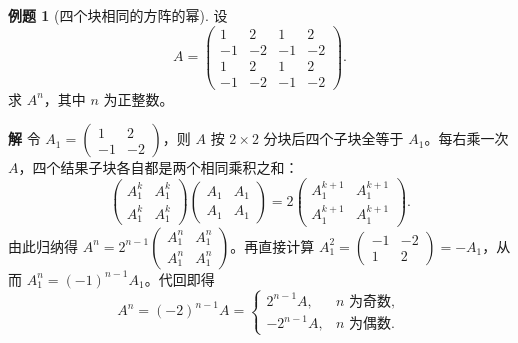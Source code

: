 \documentclass[UTF8, fontset=fandol, a4paper, 12pt]{ctexart}
\theoremstyle{definition}
\newtheorem{example}[definition]{例题}
\begin{document}
\begin{example}[四个块相同的方阵的幂]
设
\[
 A=\begin{pmatrix}
  1&2&1&2\\
  -1&-2&-1&-2\\
  1&2&1&2\\
  -1&-2&-1&-2
 \end{pmatrix}.
\]
求 $A^n$，其中 $n$ 为正整数。
\end{example}
\noindent\textbf{解}\quad
令 $A_1=\begin{pmatrix}1&2\\-1&-2\end{pmatrix}$，则 $A$ 按 $2\times 2$ 分块后四个子块全等于 $A_1$。每右乘一次 $A$，四个结果子块各自都是两个相同乘积之和：
\[
 \begin{pmatrix}A_1^k&A_1^k\\ A_1^k&A_1^k\end{pmatrix}
 \begin{pmatrix}A_1&A_1\\ A_1&A_1\end{pmatrix}
 =2\begin{pmatrix}A_1^{k+1}&A_1^{k+1}\\ A_1^{k+1}&A_1^{k+1}\end{pmatrix}.
\]
由此归纳得 $A^n=2^{n-1}\begin{pmatrix}A_1^n&A_1^n\\ A_1^n&A_1^n\end{pmatrix}$。再直接计算 $A_1^2=\begin{pmatrix}-1&-2\\1&2\end{pmatrix}=-A_1$，从而 $A_1^n=(-1)^{n-1}A_1$。代回即得
\[
 A^n=(-2)^{n-1}A
 =\begin{cases}
    2^{n-1}A, & n\text{ 为奇数},\\
    -2^{n-1}A, & n\text{ 为偶数}.
  \end{cases}
\]
\end{document}
